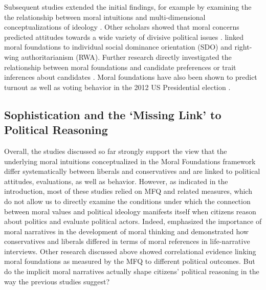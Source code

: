 \documentclass[12pt]{article}
\begin{document}
Subsequent studies extended the initial findings, for example by examining the the relationship between moral intuitions and multi-dimensional conceptualizations of ideology \citep[c.f.][]{haidt2009above}.  Other scholars showed that moral concerns predicted attitudes towards a wide variety of divisive political issues \citep[e.g.][]{koleva2012tracing,low2015moral}. \citet{federico2013mapping} linked moral foundations to individual social dominance orientation (SDO) and right-wing authoritarianism (RWA). Further research directly investigated the relationship between moral foundations and candidate preferences \citep{iyer2010beyond} or trait inferences about candidates \citep{clifford2014linking}. Moral foundations have also been shown to predict turnout \citep{johnson2014ideology} as well as voting behavior in the 2012 US Presidential election \citep{franks2015using}.


\subsection{Sophistication and the `Missing Link' to Political Reasoning}

Overall, the studies discussed so far strongly support the view that the underlying moral intuitions conceptualized in the Moral Foundations framework differ systematically between liberals and conservatives and are linked to political attitudes, evaluations, as well as behavior. However, as indicated in the introduction, most of these studies relied on MFQ and related measures, which do not allow us to directly examine the conditions under which the connection between moral values and political ideology manifests itself when citizens reason about politics and evaluate political actors. Indeed, \citet{haidt2008moral} emphasized the importance of moral narratives in the development of moral thinking and \citet{mcadams2008family} demonstrated how conservatives and liberals differed in terms of moral references in life-narrative interviews. Other research discussed above showed correlational evidence linking moral foundations as measured by the MFQ to different political outcomes. But do the implicit moral narratives actually shape citizens' political reasoning in the way the previous studies suggest?
\end{document}

